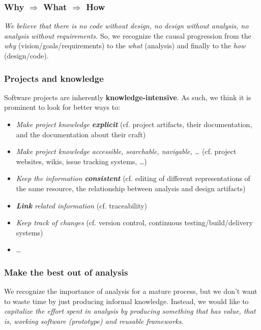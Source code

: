 \documentclass[11pt]{article}
\begin{document}
\subsubsection*{Why $\Rightarrow$ What $\Rightarrow$ How}

\emph{We believe that there is no code without design, no design without
analysis, no analysis without requirements.} So, we recognize the causal
progression from the \emph{why} (vision/goals/requirements) to the \emph{what}
(analysis) and finally to the \emph{how} (design/code).


\subsubsection*{Projects and knowledge}

Software projects are inherently \textbf{knowledge-intensive}. 
  As such, we think it is prominent to look for better ways to:
  
\begin{itemize}
  \item \emph{Make project knowledge \textbf{explicit}} (cf. project artifacts,
  their documentation, and the documentation about their craft)
  \item \emph{Make project knowledge accessible, searchable, navigable, \ldots
  }(cf. project websites, wikis, issue tracking systems, \ldots)
  \item \emph{Keep the information \textbf{consistent}} (cf. editing of
  different representations of the same resource, the relationship between analysis and
  design artifacts)
  \item \emph{\textbf{Link} related information} (cf. traceability)
  \item \emph{Keep track of changes} (cf. version control, continuous
  testing/build/delivery systems)
  \item \ldots
\end{itemize}

\subsubsection*{Make the best out of analysis}

We recognize the importance of analysis for a mature process, but we don't want
to waste time by just producing informal knowledge. 
Instead, we would like to \emph{capitalize the
effort spent in analysis by producing something that has value, that is, 
working software (prototype) and reusable frameworks}.
\end{document}
